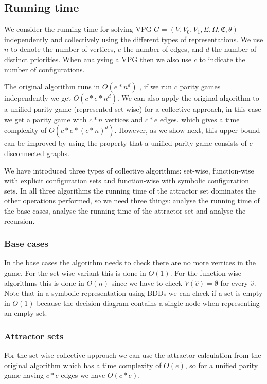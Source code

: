 \subsection{Running time}
We consider the running time for solving VPG $G = (V,V_0,V_1,E,\Omega,\mathfrak{C},\theta)$ independently and collectively using the different types of representations. We use $n$ to denote the number of vertices, $e$ the number of edges, and $d$ the number of distinct priorities. When analysing a VPG then we also use $c$ to indicate the number of configurations.

The original algorithm runs in $O(e * n^d)$ \cite{friedmanPG}, if we run $c$ parity games independently we get $O(c * e * n ^d)$. We can also apply the original algorithm to a unified parity game (represented set-wise) for a collective approach, in this case we get a parity game with $c*n$ vertices and $c*e$ edges. which gives a time complexity of $O(c*e*(c*n)^d)$. However, as we show next, this upper bound can be improved by using the property that a unified parity game consists of $c$ disconnected graphs.

We have introduced three types of collective algorithms: set-wise, function-wise with explicit configuration sets and function-wise with symbolic configuration sets. In all three algorithms the running time of the attractor set dominates the other operations performed, so we need three things: analyse the running time of the base cases, analyse the running time of the attractor set and analyse the recursion.

\subsubsection{Base cases} In the base cases the algorithm needs to check there are no more vertices in the game. For the set-wise variant this is done in $O(1)$. For the function wise algorithms this is done in $O(n)$ since we have to check $V(\hat{v}) = \emptyset$ for every $\hat{v}$. Note that in a symbolic representation using BDDs we can check if a set is empty in $O(1)$ because the decision diagram contains a single node when representing an empty set.

\subsubsection{Attractor sets} For the set-wise collective approach we can use the attractor calculation from the original algorithm which has a time complexity of $O(e)$, so for a unified parity game having $c*e$ edges we have $O(c*e)$.

